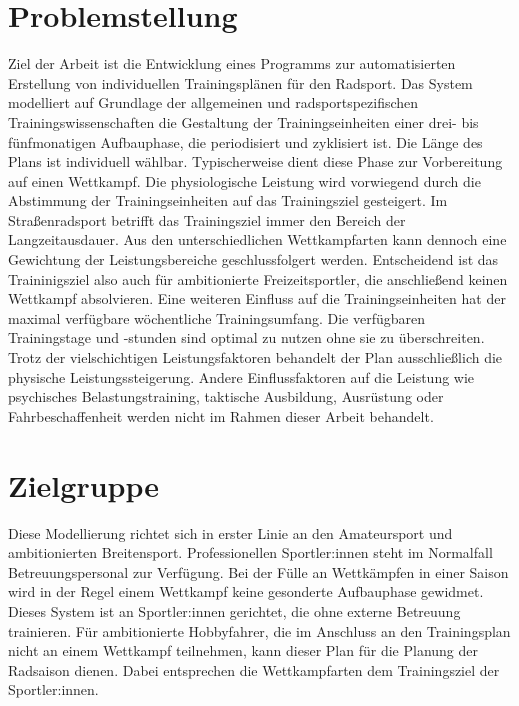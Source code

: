 \section{Problemstellung}
\label{sec:einleitung:problem}
Ziel der Arbeit ist die Entwicklung eines Programms zur automatisierten Erstellung von individuellen Trainingsplänen für den Radsport.
Das System modelliert auf Grundlage der allgemeinen und radsportspezifischen Trainingswissenschaften die Gestaltung der Trainingseinheiten einer drei- bis fünfmonatigen Aufbauphase, die periodisiert und zyklisiert ist. Die Länge des Plans ist individuell wählbar.
Typischerweise dient diese Phase zur Vorbereitung auf einen Wettkampf. Die physiologische Leistung wird vorwiegend durch die Abstimmung der Trainingseinheiten auf das Trainingsziel gesteigert. Im Straßenradsport betrifft das Trainingsziel immer den Bereich der Langzeitausdauer. Aus den unterschiedlichen Wettkampfarten kann dennoch eine Gewichtung der Leistungsbereiche geschlussfolgert werden. Entscheidend ist das Traininigsziel also auch für ambitionierte Freizeitsportler, die anschließend keinen Wettkampf absolvieren.\newline
Eine weiteren Einfluss auf die Trainingseinheiten hat der maximal verfügbare wöchentliche Trainingsumfang. Die verfügbaren Trainingstage und -stunden sind optimal zu nutzen ohne sie zu überschreiten. 
Trotz der vielschichtigen Leistungsfaktoren behandelt der Plan ausschließlich die physische Leistungssteigerung. Andere Einflussfaktoren auf die Leistung wie psychisches Belastungstraining, taktische Ausbildung, Ausrüstung oder Fahrbeschaffenheit \cite[13-15]{Radsporttraining} werden nicht im Rahmen dieser Arbeit behandelt.

\section{Zielgruppe}
Diese Modellierung richtet sich in erster Linie an den Amateursport und ambitionierten Breitensport. Professionellen Sportler:innen steht im Normalfall Betreuungspersonal zur Verfügung. Bei der Fülle an Wettkämpfen in einer Saison wird in der Regel einem Wettkampf keine gesonderte Aufbauphase gewidmet. Dieses System ist an Sportler:innen gerichtet, die ohne externe Betreuung trainieren. Für ambitionierte Hobbyfahrer, die im Anschluss an den Trainingsplan nicht an einem Wettkampf teilnehmen, kann dieser Plan für die Planung der Radsaison dienen. Dabei entsprechen die Wettkampfarten dem Trainingsziel der Sportler:innen.

